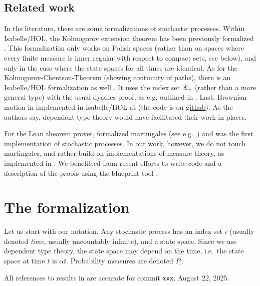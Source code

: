 \documentclass[lean]{Draft}
\begin{document}
\subsection{Related work}
In the literature, there are some formalizations of stochastic processes. Within Isabelle/HOL, the Kolmogorov extension theorem has been previously formalized \cite{Immler2012}. This formalization only works on Polish spaces (rather than on spaces where every finite measure is inner regular with respect to compact sets, see below), and only in the case where the state spaces for all times are identical. As for the Kolmogorov-Chentson-Theorem (showing continuity of paths), there is an Isabelle/HOL formalization as well \cite{Kolmogorov_Chentsov-AFP}. It uses the index set  $\mathbb{R}_+$ (rather than a more general type) with the usual dyadics proof, as e.g. outlined in \cite{kallenberg2021}. Last,
Brownian motion in implemented in Isabelle/HOL at \cite{laursen2024brownian} (the code is on \href{https://github.com/cplaursen/Brownian_Motion}{github}). As the authors say, dependent type theory would have facilitated their work in places.

For the Lean theorem prover, \cite{ying2023formalization} formalized martingales (see e.g.\ \cite{kallenberg2021}) and was the first implementation of stochastic processes. In our work, however, we do not touch martingales, and rather build on implementations of measure theory, as implemented in \cite{mathlib}. We benefitted from recent efforts to write code and a description of the proofs using the blueprint tool \cite{Monticone_LeanProject_2025}.

\section{The formalization}
Let us start with our notation. Any stochastic process has an index set $\iota$ (usually denoted {\em time}, usually uncountably infinite), and a state space. Since we use dependent type theory, the state space may depend on the time, i.e.\ the state space at time $t$ is $\alpha t$. Probability measures are denoted $P_.$.

All references to results in \mathlib are accurate for commit {\tt xxx}, August 22, 2025.
\end{document}
